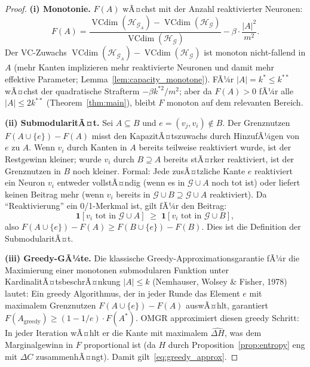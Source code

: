 ﻿\documentclass[12pt, a4paper, openany]{report}
\newcommand{\calG}{\mathcal{G}}
\newcommand{\calH}{\mathcal{H}}
\DeclareMathOperator{\VC}{VCdim}
\begin{document}
\begin{proof}
\textbf{(i) Monotonie.}
$F(A)$ wÃ¤chst mit der Anzahl reaktivierter Neuronen:
\[
  F(A) = \frac{\VC(\calH_{\calG_A}) - \VC(\calH_\calG)}{\VC(\calH_\calG)} - \beta\cdot\frac{|A|^2}{m^2}.
\]
Der VC-Zuwachs $\VC(\calH_{\calG_A}) - \VC(\calH_\calG)$ ist monoton
nicht-fallend in $A$ (mehr Kanten implizieren mehr reaktivierte Neuronen
und damit mehr effektive Parameter; Lemma~\ref{lem:capacity_monotone}).
FÃ¼r $|A| = k^* \leq k^{**}$ wÃ¤chst der quadratische Strafterm $-\beta k^{*2}/m^2$;
aber da $F(A) > 0$ fÃ¼r alle $|A| \leq 2k^{**}$ (Theorem~\ref{thm:main}),
bleibt $F$ monoton auf dem relevanten Bereich.

\textbf{(ii) SubmodularitÃ¤t.}
Sei $A \subseteq B$ und $e = (v_j, v_i) \notin B$.  Der Grenznutzen
$F(A \cup \{e\}) - F(A)$ misst den KapazitÃ¤tszuwachs durch HinzufÃ¼gen
von $e$ zu $A$.  Wenn $v_i$ durch Kanten in $A$ bereits teilweise
reaktiviert wurde, ist der Restgewinn kleiner; wurde $v_i$ durch $B \supseteq A$
bereits stÃ¤rker reaktiviert, ist der Grenznutzen in $B$ noch kleiner.
Formal: Jede zusÃ¤tzliche Kante $e$ reaktiviert ein Neuron $v_i$ entweder
vollstÃ¤ndig (wenn es in $\calG \cup A$ noch tot ist) oder liefert keinen
Beitrag mehr (wenn $v_i$ bereits in $\calG \cup B \supseteq \calG \cup A$ reaktiviert).
Da ``Reaktivierung'' ein 0/1-Merkmal ist, gilt fÃ¼r den Beitrag:
\[
  \mathbf{1}[v_i \text{ tot in } \calG \cup A]
  \;\geq\;
  \mathbf{1}[v_i \text{ tot in } \calG \cup B],
\]
also $F(A \cup \{e\}) - F(A) \geq F(B \cup \{e\}) - F(B)$. Dies ist die
Definition der SubmodularitÃ¤t.

\textbf{(iii) Greedy-GÃ¼te.}
Die klassische Greedy-Approximationsgarantie fÃ¼r die Maximierung einer
monotonen submodularen Funktion unter KardinalitÃ¤tsbeschrÃ¤nkung $|A| \leq k$
(Nemhauser, Wolsey \& Fisher, 1978) lautet:
Ein greedy Algorithmus, der in jeder Runde das Element $e$ mit maximalem
Grenznutzen $F(A \cup \{e\}) - F(A)$ auswÃ¤hlt, garantiert
$F(A_{\mathrm{greedy}}) \geq (1 - 1/e) \cdot F(A^*)$.
OMGR approximiert diesen greedy Schritt:
In jeder Iteration wÃ¤hlt er die Kante mit maximalem $\widehat{\Delta H}$,
was dem Marginalgewinn in $F$ proportional ist (da $H$ durch Proposition~\ref{prop:entropy}
eng mit $\Delta C$ zusammenhÃ¤ngt).  Damit gilt~\eqref{eq:greedy_approx}.
\end{proof}
\end{document}
